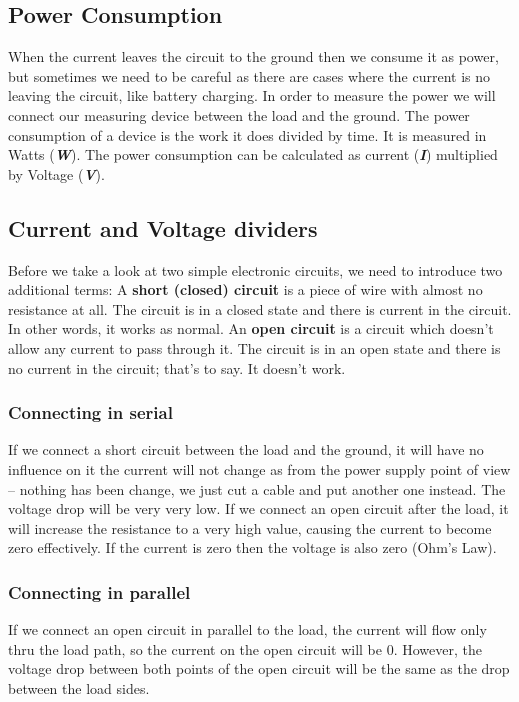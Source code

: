 \subsection{Power Consumption}
When the current leaves the circuit to the ground then we consume it as power, but sometimes we need to be careful as there are cases where the current is no leaving the circuit, like battery charging. In order to measure the power we will connect our measuring device between the load and the ground.
The power consumption of a device is the work it does divided by time. It is measured in Watts (\textbf{\textit{W}}).
The power consumption can be calculated as current (\textbf{\textit{I}}) multiplied by Voltage (\textbf{\textit{V}}).
\subsection{Current and Voltage dividers}
Before we take a look at two simple electronic circuits, we need to introduce two additional terms:
A \textbf{short (closed) circuit} is a piece of wire with almost no resistance at all. The circuit is in a closed state and there is current in the circuit. In other words, it works as normal.
An \textbf{open circuit} is a circuit which doesn't allow any current to pass through it. The circuit is in an open state and there is no current in the circuit; that’s to say. It doesn’t work.
\subsubsection{Connecting in serial}
If we connect a short circuit between the load and the ground, it will have no influence on it the current will not change as from the power supply point of view – nothing has been change, we just cut a cable and put another one instead. The voltage drop will be very very low.
If we connect an open circuit after the load, it will increase the resistance to a very high value, causing the current to become zero effectively. If the current is zero then the voltage is also zero (Ohm’s Law).
\subsubsection{Connecting in parallel}
If we connect an open circuit in parallel to the load, the current will flow only thru the load path, so the current on the open circuit will be 0. However, the voltage drop between both points of the open circuit will be the same as the drop between the load sides.

